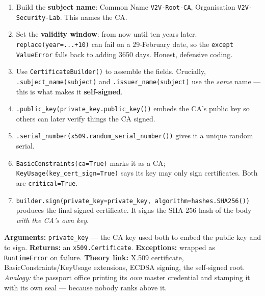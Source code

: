 \documentclass[11pt,a4paper]{report}
\begin{document}
\begin{enumerate}
  \item Build the \textbf{subject name}: Common Name \texttt{V2V-Root-CA},
        Organisation \texttt{V2V-Security-Lab}. This names the CA.
  \item Set the \textbf{validity window}: from now until ten years later.
        \texttt{replace(year=...+10)} can fail on a 29-February date, so the
        \texttt{except ValueError} falls back to adding 3650 days. Honest,
        defensive coding.
  \item Use \texttt{CertificateBuilder()} to assemble the fields. Crucially,
        \texttt{.subject\_name(subject)} and \texttt{.issuer\_name(subject)} use
        the \emph{same} name --- this is what makes it \textbf{self-signed}.
  \item \texttt{.public\_key(private\_key.public\_key())} embeds the CA's public
        key so others can later verify things the CA signed.
  \item \texttt{.serial\_number(x509.random\_serial\_number())} gives it a unique
        random serial.
  \item \texttt{BasicConstraints(ca=True)} marks it as a CA;
        \texttt{KeyUsage(key\_cert\_sign=True)} says its key may only sign
        certificates. Both are \texttt{critical=True}.
  \item \texttt{builder.sign(private\_key=private\_key,
        algorithm=hashes.SHA256())} produces the final signed certificate. It
        signs the SHA-256 hash of the body \emph{with the CA's own key}.
\end{enumerate}
\textbf{Arguments:} \texttt{private\_key} --- the CA key used both to embed the
public key and to sign. \textbf{Returns:} an \texttt{x509.Certificate}.
\textbf{Exceptions:} wrapped as \texttt{RuntimeError} on failure.
\textbf{Theory link:} X.509 certificate, BasicConstraints/KeyUsage extensions,
ECDSA signing, the self-signed root. \emph{Analogy:} the passport office printing
its \emph{own} master credential and stamping it with its own seal --- because
nobody ranks above it.
\end{document}
